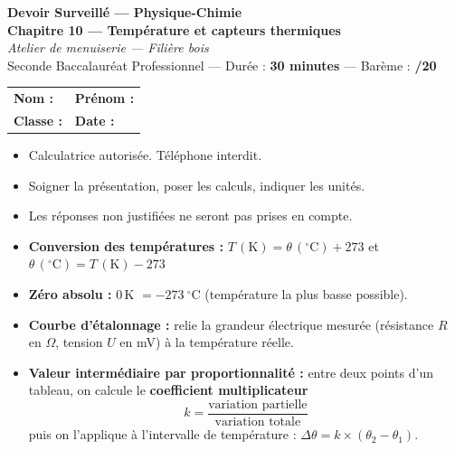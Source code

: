 \documentclass[a4paper,11pt]{article}
\begin{document}
\begin{center}
{\LARGE\bfseries\color{violet} Devoir Surveillé — Physique-Chimie}\\[4pt]
{\large\bfseries Chapitre 10 — Température et capteurs thermiques}\\[4pt]
{\normalsize\itshape Atelier de menuiserie — Filière bois}\\[6pt]
{\normalsize Seconde Baccalauréat Professionnel — Durée : \textbf{30 minutes} — Barème : \textbf{/20}}
\end{center}

\vspace{2pt}
\noindent
\begin{tabular}{@{}p{}p{}@{}}
\textbf{Nom :} \dotfill & \textbf{Prénom :} \dotfill \\[6pt]
\textbf{Classe :} \dotfill & \textbf{Date :} \dotfill \\
\end{tabular}

\vspace{4pt}
\begin{consigne}
\begin{itemize}[leftmargin=*,itemsep=1pt,topsep=2pt]
  \item Calculatrice autorisée. Téléphone interdit.
  \item Soigner la présentation, poser les calculs, indiquer les unités.
  \item Les réponses non justifiées ne seront pas prises en compte.
\end{itemize}
\end{consigne}

\begin{rappel}
\begin{itemize}[leftmargin=*,itemsep=1pt,topsep=2pt]
  \item \textbf{Conversion des températures :} $T\,(\text{K}) = \theta\,(^\circ\text{C}) + 273$
        \quad et \quad $\theta\,(^\circ\text{C}) = T\,(\text{K}) - 273$
  \item \textbf{Zéro absolu :} $0$\,K $= -273\ ^\circ$C (température la plus basse possible).
  \item \textbf{Courbe d'étalonnage :} relie la grandeur électrique mesurée (résistance $R$ en $\Omega$, tension $U$ en mV) à la température réelle.
  \item \textbf{Valeur intermédiaire par proportionnalité :} entre deux points d'un tableau, on calcule le \textbf{coefficient multiplicateur}
        \[ k = \dfrac{\text{variation partielle}}{\text{variation totale}} \]
        puis on l'applique à l'intervalle de température : $\Delta\theta = k\times (\theta_2 - \theta_1)$.
\end{itemize}
\end{rappel}
\end{document}
